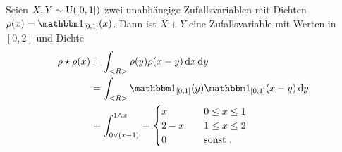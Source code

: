 \begin{example}
	Seien $X,Y \sim \operatorname{U}([0,1])$ zwei unabhängige Zufallsvariablen mit Dichten $\rho(x) = \indi_{[0,1]}(x)$. Dann ist $X+Y$ eine Zufallsvariable mit Werten in $[0,2]$ und Dichte
	\begin{align*}
		\rho \star \rho(x) &= \int_{\R} \rho(y) \rho(x-y) \d x \d y\\
		&= \int_{\R} \indi_{[0,1]}(y) \indi_{[0,1]}(x-y) \d y\\
		&= \int_{0 \vee (x-1)}^{1 \wedge x} = \begin{cases}
		x &\quad 0 \le x \le 1\\
		2 -x &\quad 1 \le x \le 2\\
		0 &\quad \sonst.
		\end{cases}
	\end{align*} %
%	
%	
\end{example}